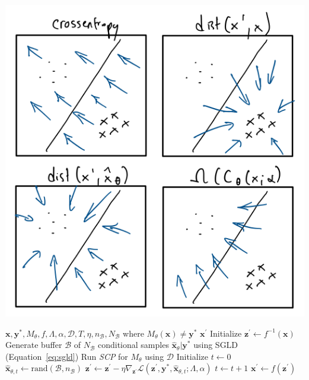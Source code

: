 \documentclass{article}
\begin{document}
\begin{minipage}[c]{0.40\textwidth}
  \centering
  \includegraphics[width=\textwidth]{../artifacts/results/images/eccco_illustration.png}
   \label{fig:eccco}
\end{minipage}  
\hfill
\begin{minipage}[c]{0.50\textwidth}
\label{alg:eccco}
\begin{algorithmic}[1]
  \Require $\mathbf{x}, \mathbf{y}^*, M_{\theta}, f, \Lambda, \alpha, \mathcal{D}, T, \eta, n_{\mathcal{B}}, N_{\mathcal{B}}$ \linebreak where $M_{\theta}(\mathbf{x})\neq\mathbf{y}^*$
  \Ensure $\mathbf{x}^\prime$
  \State Initialize $\mathbf{z}^\prime \gets f^{-1}(\mathbf{x})$
  \State Generate buffer $\mathcal{B}$ of $N_{\mathcal{B}}$ conditional samples $\hat{\mathbf{x}}_{\theta}|\mathbf{y}^*$ using SGLD (Equation~\ref{eq:sgld})
  \State Run \textit{SCP} for $M_{\theta}$ using $\mathcal{D}$
  \State Initialize $t \gets 0$
  \State $\hat{\mathbf{x}}_{\theta, t} \gets \text{rand}(\mathcal{B},n_{\mathcal{B}})$
  \State $\mathbf{z}^\prime \gets \mathbf{z}^\prime - \eta \nabla_{\mathbf{z}^\prime} \mathcal{L}(\mathbf{z}^\prime,\mathbf{y}^*,\hat{\mathbf{x}}_{\theta, t}; \Lambda, \alpha)$
  \State $t \gets t+1$
  \EndWhile
  \State $\mathbf{x}^\prime \gets f(\mathbf{z}^\prime)$
\end{algorithmic}
\end{minipage}
\end{document}
